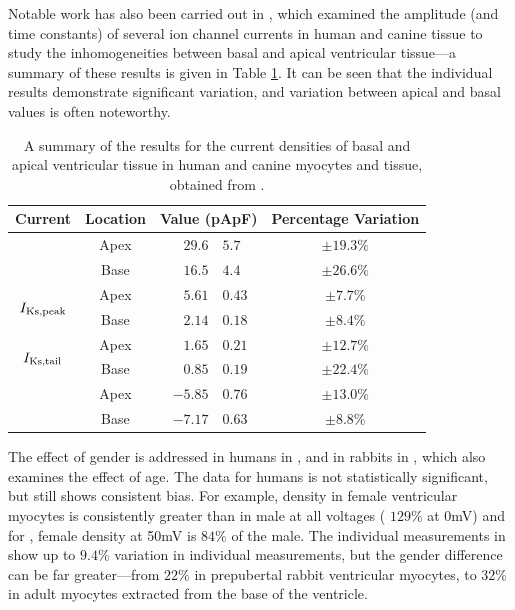 \documentclass[../thesis-main.tex]{subfiles}
\begin{document}
Notable work has also been carried out in \citet{Szentadrassy2005}, which examined the amplitude (and time constants) of several ion channel currents in human and canine tissue to study the inhomogeneities between basal and apical ventricular tissue---a summary of these results is given in Table \ref{table:szentadrassy-results}. It can be seen that the individual results demonstrate significant variation, and variation between apical and basal values is often noteworthy.
\begin{table}
 \centering
 \begin{tabular}{ccr@{$\pm$}lc}
  Current					& Location	& \multicolumn{2}{c}{Value (pApF\super{-1})}	& Percentage Variation	\\
  \hline
  \hline
  \multirow{2}{*}{\ito{}}			& Apex		& $29.6$&$5.7$					& $\pm19.3\%$		\\
						& Base		& $16.5$&$4.4$					& $\pm26.6\%$		\\
  \hline
  \multirow{2}{*}{$I_\textnormal{Ks,peak}$}	& Apex		& $5.61$&$0.43$					& $\pm7.7\%$		\\
						& Base		& $2.14$&$0.18$					& $\pm8.4\%$		\\
  \hline
  \multirow{2}{*}{$I_\textnormal{Ks,tail}$}	& Apex		& $1.65$&$0.21$					& $\pm12.7\%$		\\
						& Base		& $0.85$&$0.19$					& $\pm22.4\%$		\\
  \hline
  \multirow{2}{*}{\ica{}}			& Apex		& $-5.85$&$0.76$				& $\pm13.0\%$		\\
						& Base		& $-7.17$&$0.63$				& $\pm8.8\%$		\\
 \end{tabular}
 \caption[Summary of current density results from \citet{Szentadrassy2005}.]{A summary of the results for the current densities of basal and apical ventricular tissue in human and canine myocytes and tissue, obtained from \citet{Szentadrassy2005}.}
 \label{table:szentadrassy-results}
\end{table}

The effect of gender is addressed in humans in \citet{Verkerk2005}, and in rabbits in \citet{Sims2008}, which also examines the effect of age. The data for humans is not statistically significant, but still shows consistent bias. For example, \ica{} density in female ventricular myocytes is consistently greater than in male at all voltages (\eg{} $129\%$ at 0mV) and for \ito{}, female \ito{} density at 50mV is $84\%$ of the male. The individual measurements in \citet{Sims2008} show up to $9.4\%$ variation in individual measurements, but the gender difference can be far greater---from $22\%$ in prepubertal rabbit ventricular myocytes, to $32\%$ in adult myocytes extracted from the base of the ventricle.
\end{document}
